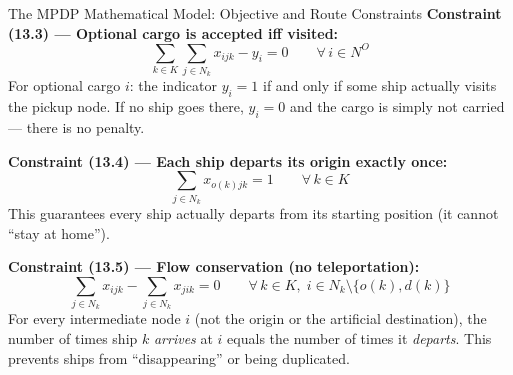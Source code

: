 \documentclass[aspectratio=169,10pt]{beamer}
\begin{document}
\begin{frame}[allowframebreaks]{The MPDP Mathematical Model: Objective and Route Constraints}
  \medskip
  \textbf{Constraint (13.3) --- Optional cargo is accepted iff visited:}
  \begin{equation}
    \sum_{k \in K} \sum_{j \in N_k} x_{ijk} - y_i = 0
    \qquad \forall\, i \in N^O
    \tag{13.3}
  \end{equation}
  For optional cargo $i$: the indicator $y_i = 1$ if and only if some ship
  actually visits the pickup node.  If no ship goes there, $y_i = 0$ and
  the cargo is simply not carried --- there is no penalty.

  \medskip
  \textbf{Constraint (13.4) --- Each ship departs its origin exactly once:}
  \begin{equation}
    \sum_{j \in N_k} x_{o(k)jk} = 1 \qquad \forall\, k \in K
    \tag{13.4}
  \end{equation}
  This guarantees every ship actually departs from its starting position
  (it cannot ``stay at home'').

  \medskip
  \textbf{Constraint (13.5) --- Flow conservation (no teleportation):}
  \begin{equation}
    \sum_{j \in N_k} x_{ijk} - \sum_{j \in N_k} x_{jik} = 0
    \qquad \forall\, k \in K,\;
    i \in N_k \setminus \{o(k), d(k)\}
    \tag{13.5}
  \end{equation}
  For every intermediate node $i$ (not the origin or the artificial destination),
  the number of times ship $k$ \emph{arrives} at $i$ equals the number of times
  it \emph{departs}.  This prevents ships from ``disappearing'' or being duplicated.
\end{frame}
\end{document}
